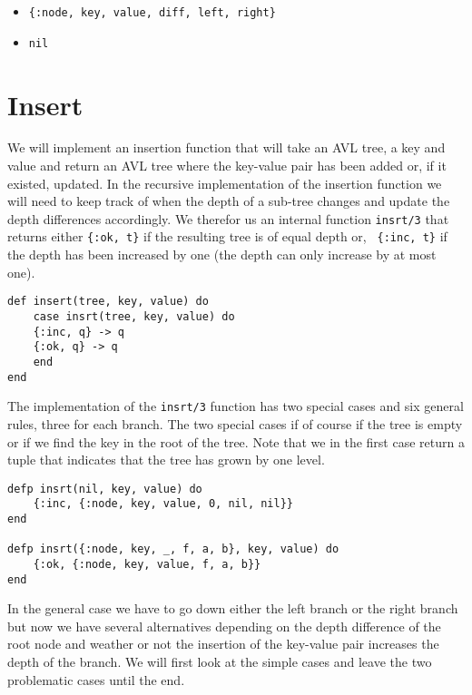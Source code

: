 \documentclass[a4paper,11pt]{article}
\begin{document}
\begin{itemize}
\item {\tt \{:node, key, value, diff, left, right\}}
\item {\tt nil}
\end{itemize}



\section{Insert}

We will implement an insertion function that will take an AVL tree, a
key and value and return an AVL tree where the key-value pair has been
added or, if it existed, updated. In the recursive implementation of
the insertion function we will need to keep track of when the depth of
a sub-tree changes and update the depth differences accordingly. We
therefor us an internal function {\tt insrt/3} that returns either
{\tt\{:ok, t\}} if the resulting tree is of equal depth or, {\tt
\{:inc, t\}} if the depth has been increased by one (the depth can only
increase by at most one).

\begin{verbatim}
def insert(tree, key, value) do
    case insrt(tree, key, value) do
    {:inc, q} -> q
    {:ok, q} -> q
    end
end
\end{verbatim}

The implementation of the {\tt insrt/3} function has two special cases
and six general rules, three for each branch. The two special cases if
of course if the tree is empty or if we find the key in the root of
the tree. Note that we in the first case return a tuple that indicates
that the tree has grown by one level.

\begin{verbatim}
defp insrt(nil, key, value) do
    {:inc, {:node, key, value, 0, nil, nil}} 
end

defp insrt({:node, key, _, f, a, b}, key, value) do
    {:ok, {:node, key, value, f, a, b}}
end
\end{verbatim}

In the general case we have to go down either the left branch or the
right branch but now we have several alternatives depending on the
depth difference of the root node and weather or not the insertion of
the key-value pair increases the depth of the branch. We will first
look at the simple cases and leave the two problematic cases until the end.
\end{document}

